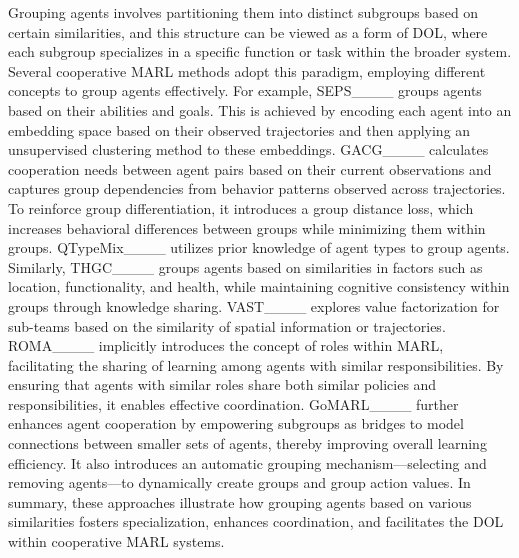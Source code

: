 Grouping agents involves partitioning them into distinct subgroups based on certain similarities, and this structure can be viewed as a form of DOL, where each subgroup specializes in a specific function or task within the broader system.
Several cooperative MARL methods adopt this paradigm, employing different concepts to group agents effectively.
For example, SEPS____ groups agents based on their abilities and goals. This is achieved by encoding each agent into an embedding space based on their observed trajectories and then applying an unsupervised clustering method to these embeddings.
GACG____ calculates cooperation needs between agent pairs based on their current observations and captures group dependencies from behavior patterns observed across trajectories. To reinforce group differentiation, it introduces a group distance loss, which increases behavioral differences between groups while minimizing them within groups.
QTypeMix____ utilizes prior knowledge of agent types to group agents.
Similarly, THGC____ groups agents based on similarities in factors such as location, functionality, and health, while maintaining cognitive consistency within groups through knowledge sharing.
VAST____ explores value factorization for sub-teams based on the similarity of spatial information or trajectories.
ROMA____ implicitly introduces the concept of roles within MARL, facilitating the sharing of learning among agents with similar responsibilities. By ensuring that agents with similar roles share both similar policies and responsibilities, it enables effective coordination.
GoMARL____ further enhances agent cooperation by empowering subgroups as bridges to model connections between smaller sets of agents, thereby improving overall learning efficiency. It also introduces an automatic grouping mechanism—selecting and removing agents—to dynamically create groups and group action values.
In summary, these approaches illustrate how grouping agents based on various similarities fosters specialization, enhances coordination, and facilitates the DOL within cooperative MARL systems.

